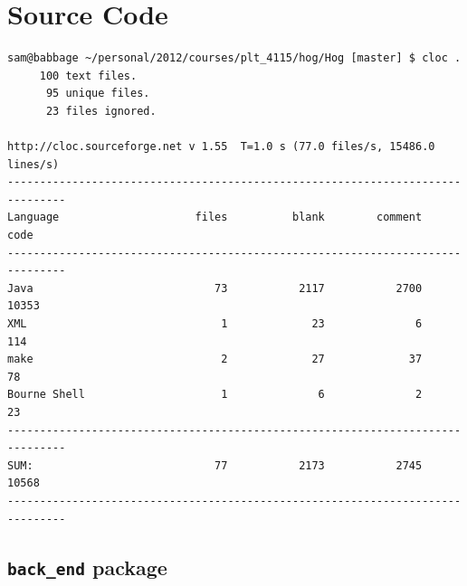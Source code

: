 \documentclass{report}
\begin{document}
\chapter{Source Code}

\begin{verbatim}
sam@babbage ~/personal/2012/courses/plt_4115/hog/Hog [master] $ cloc .
     100 text files.
      95 unique files.                              
      23 files ignored.

http://cloc.sourceforge.net v 1.55  T=1.0 s (77.0 files/s, 15486.0 lines/s)
-------------------------------------------------------------------------------
Language                     files          blank        comment           code
-------------------------------------------------------------------------------
Java                            73           2117           2700          10353
XML                              1             23              6            114
make                             2             27             37             78
Bourne Shell                     1              6              2             23
-------------------------------------------------------------------------------
SUM:                            77           2173           2745          10568
-------------------------------------------------------------------------------

\end{verbatim}

\section{\texttt{back\_end} package}
\end{document}
